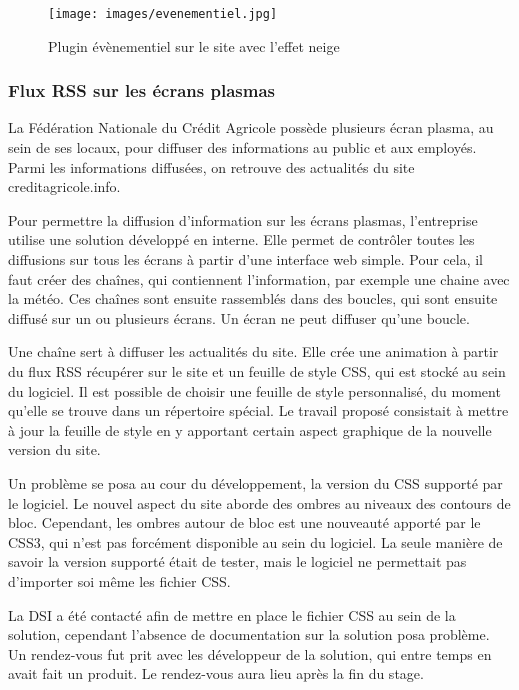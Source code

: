 \documentclass[12pt,a4paper]{article}
\begin{document}
\begin{figure}[h!]
\centering
\texttt{[image: images/evenementiel.jpg]}
\caption{Plugin évènementiel sur le site avec l'effet neige}
\end{figure}

\subsubsection{Flux RSS sur les écrans plasmas}
La Fédération Nationale du Crédit Agricole possède plusieurs écran plasma, au sein de ses locaux, pour diffuser des informations au public et aux employés. Parmi les informations diffusées, on retrouve des actualités du site creditagricole.info.\par 
Pour permettre la diffusion d'information sur les écrans plasmas, l'entreprise utilise une solution développé en interne. Elle permet de contrôler toutes les diffusions sur tous les écrans à partir d'une interface web simple. Pour cela, il faut créer des chaînes, qui contiennent l'information, par exemple une chaine avec la météo. Ces chaînes sont ensuite rassemblés dans des boucles, qui sont ensuite diffusé sur un ou plusieurs écrans. Un écran ne peut diffuser qu'une boucle.\par 
Une chaîne sert à diffuser les actualités du site. Elle crée une animation à partir du flux RSS récupérer sur le site et un feuille de style CSS, qui est stocké au sein du logiciel. Il est possible de choisir une feuille de style personnalisé, du moment qu'elle se trouve dans un répertoire spécial. Le travail proposé consistait à mettre à jour la feuille de style en y apportant certain aspect graphique de la nouvelle version du site.\par 
Un problème se posa au cour du développement, la version du CSS supporté par le logiciel. Le nouvel aspect du site aborde des ombres au niveaux des contours de bloc. Cependant, les ombres autour de bloc est une nouveauté apporté par le CSS3, qui n'est pas forcément disponible au sein du logiciel. La seule manière de savoir la version supporté était de tester, mais le logiciel ne permettait pas d'importer soi même les fichier CSS.\par 
La DSI a été contacté afin de mettre en place le fichier CSS au sein de la solution, cependant l'absence de documentation sur la solution posa problème. Un rendez-vous fut prit avec les développeur de la solution, qui entre temps en avait fait un produit. Le rendez-vous aura lieu après la fin du stage.\par
\end{document}
